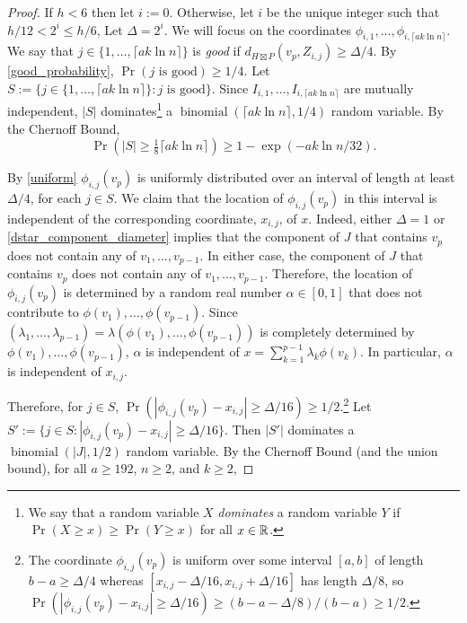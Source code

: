 \documentclass{patmorin}
\renewcommand{\ge}{\geqslant}
\renewcommand{\le}{\leqslant}
\newcommand{\defin}[1]{\emph{\textcolor{brightmaroon}{#1}}}
\begin{document}
\begin{proof}
  If $h < 6$ then let $i:=0$.  Otherwise, let $i$ be the unique integer such that $h/12< 2^i \le h/6$, Let $\Delta=2^i$.  We will focus on the coordinates $\phi_{i,1},\ldots,\phi_{i,\lceil a k\ln n\rceil}$.  We say that $j\in\{1,\ldots,\lceil a k\ln n\rceil\}$ is \defin{good} if $d_{H\boxtimes P}(v_p,Z_{i,j})\ge \Delta/4$.  By \cref{good_probability},  $\Pr(\text{$j$ is good})\ge 1/4$. Let $S:=\{j\in\{1,\ldots,\lceil a k\ln n\rceil\}:\text{$j$ is good}\}$.  Since $I_{i,1},\ldots,I_{i,\lceil a k\ln n\rceil}$ are mutually independent, $|S|$ dominates\footnote{We say that a random variable $X$ \defin{dominates} a random variable $Y$ if $\Pr(X\ge x)\ge\Pr(Y\ge x)$ for all $x\in\mathbb{R}$.} a $\operatorname{binomial}(\lceil a k\ln n\rceil,1/4)$ random variable. By the Chernoff Bound,
  $$\Pr(|S|\ge \tfrac{1}{8}\lceil a k\ln n\rceil)\ge 1-\exp(-ak\ln n/32).$$

  By \cref{uniform} $\phi_{i,j}(v_p)$ is uniformly distributed over an interval of length at least $\Delta/4$, for each $j\in S$.  We claim that the location of $\phi_{i,j}(v_p)$ in this interval is independent of the corresponding coordinate, $x_{i,j}$, of $x$.  Indeed, either $\Delta=1$ or \cref{dstar_component_diameter} implies that the component of $J$ that contains $v_p$ does not contain any of $v_1,\ldots,v_{p-1}$. In either case, the component of $J$ that contains $v_p$ does not contain any of $v_1,\ldots,v_{p-1}$.  Therefore, the location of $\phi_{i,j}(v_p)$ is determined by a random real number $\alpha\in[0,1]$ that does not contribute to $\phi(v_1),\ldots,\phi(v_{p-1})$.  Since $(\lambda_1,\ldots,\lambda_{p-1})=\lambda(\phi(v_1),\ldots,\phi(v_{p-1}))$ is completely determined by $\phi(v_1),\ldots,\phi(v_{p-1})$, $\alpha$ is independent of $x=\sum_{k=1}^{p-1}\lambda_k\phi(v_k)$.  In particular, $\alpha$ is independent of $x_{i,j}$.

  Therefore, for $j\in S$, $\Pr(|\phi_{i,j}(v_p)-x_{i,j}|\ge \Delta/16)\ge 1/2$.\footnote{The coordinate $\phi_{i,j}(v_p)$ is uniform over some interval $[a,b]$ of length $b-a\ge \Delta/4$ whereas $[x_{i,j}-\Delta/16,x_{i,j}+\Delta/16]$ has length $\Delta/8$, so $\Pr(|\phi_{i,j}(v_p)-x_{i,j}|\ge \Delta/16)\ge (b-a-\Delta/8)/(b-a)\ge 1/2$.}
  Let $S':=\{j\in S:  |\phi_{i,j}(v_p)-x_{i,j}|\ge \Delta/16\}$.  Then $|S'|$ dominates a $\operatorname{binomial}(|J|,1/2)$ random variable.  By the Chernoff Bound (and the union bound), for all $a\ge 192$, $n\ge 2$, and $k\ge 2$,


\end{proof}
\end{document}
